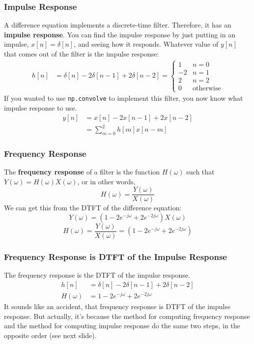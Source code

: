 \documentclass{beamer}
\begin{document}
\begin{frame}
  \frametitle{Impulse Response}

  A difference equation implements a discrete-time filter.  Therefore,
  it has an {\bf impulse response}.  You can find the impulse response
  by just putting in an impulse, $x[n]=\delta[n]$, and seeing how it
  responds.  Whatever value of $y[n]$ that comes out of the filter is
  the impulse response:
  \begin{align*}
    h[n] &= \delta[n]-2\delta[n-1]+2\delta[n-2]=\begin{cases}
    1 & n=0\\-2 & n=1\\2 & n=2\\0 & \mbox{otherwise}\end{cases}
  \end{align*}
  If you wanted to use {\tt np.convolve} to implement this filter, you
  now know what impulse response to use.
  \begin{align*}
    y[n] &= x[n] -2x[n-1]+2x[n-2]\\
    & = \sum_{m=0}^2 h[m]x[n-m]
  \end{align*}
\end{frame}  

\begin{frame}
  \frametitle{Frequency Response}

  The {\bf frequency response} of a filter is the function $H(\omega)$ such that
  $Y(\omega)=H(\omega)X(\omega)$, or in other words,
  \[
  H(\omega) = \frac{Y(\omega)}{X(\omega)}
  \]
  We can get this from the DTFT of the difference equation:
  \[
  Y(\omega)  = \left(1-2e^{-j\omega}+2e^{-2j\omega}\right) X(\omega)
  \]
  \[
  H(\omega) = \frac{Y(\omega)}{X(\omega)} = \left(1-2e^{-j\omega}+2e^{-2j\omega}\right)
  \]
\end{frame}

\begin{frame}
  \frametitle{Frequency Response is DTFT of the Impulse Response}

  The frequency response is the DTFT of the impulse response.
  \begin{align*}
    h[n] &= \delta[n]-2\delta[n-1]+2\delta[n-2]\\
    H(\omega) &= 1-2e^{-j\omega}+2e^{-2j\omega}
  \end{align*}
  It sounds like an accident, that frequency response is DTFT of the
  impulse response.  But actually, it's because the method for
  computing frequency response and the method for computing impulse
  response do the same two steps, in the opposite order (see next slide).
\end{frame}
\end{document}
